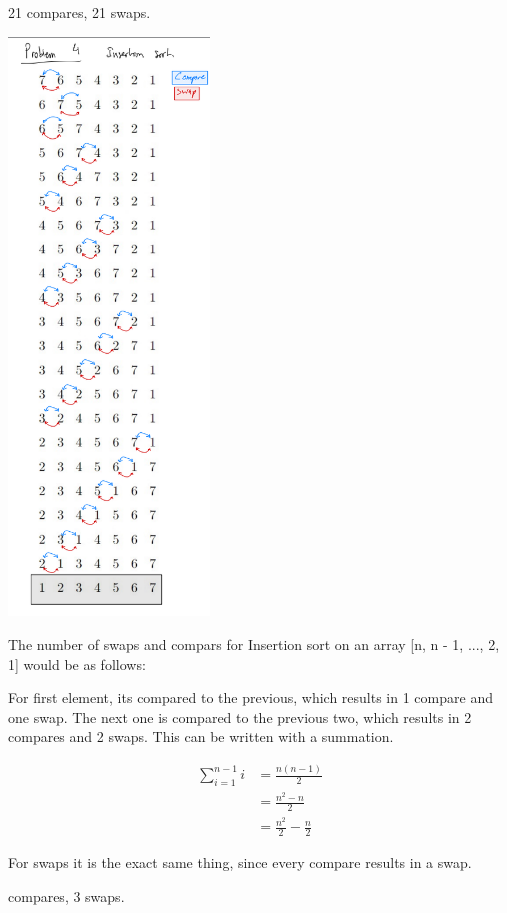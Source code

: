 \documentclass[11pt,largemargins]{homework}
\begin{document}
\begin{alphaparts}
  \questionpart

  21 compares, 21 swaps.

  \includegraphics[width=0.4\textwidth]{pictures/hw1/4a.png}

  \newpage
  \questionpart
  The number of swaps and compars for Insertion sort on an array [n, n - 1, ..., 2, 1] would be as follows:

  For first element, its compared to the previous, which results in 1 compare and one swap. The next one is
  compared to the previous two, which results in 2 compares and 2 swaps. This can be written with a summation.

  \begin{align*}
    \sum_{i = 1}^{n - 1} i &= \frac{n(n - 1)}{2} \\
    &= \frac{n^2 - n}{2} \\
    &= \frac{n^2}{2} - \frac{n}{2}
  \end{align*}

  For swaps it is the exact same thing, since every compare results in a swap.
  
  \newpage
   compares, 3 swaps.


\end{alphaparts}
\end{document}
